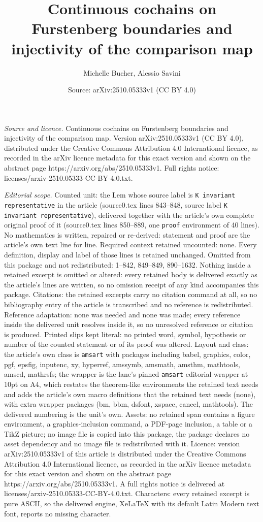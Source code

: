 \documentclass[10pt,a4paper]{amsart}
\title[Continuous cochains on Furstenberg boundaries and injectivit]{Continuous cochains on Furstenberg boundaries and injectivity of the comparison map}
\author{Michelle Bucher, Alessio Savini}
\date{Source: arXiv:2510.05333v1 (CC BY 4.0)}
\begin{document}
\maketitle

\noindent\emph{Source and licence.} Continuous cochains on Furstenberg boundaries and injectivity of the comparison map. Version arXiv:2510.05333v1 (CC BY 4.0), distributed under the Creative Commons Attribution 4.0 International licence, as recorded in the arXiv licence metadata for this exact version and shown on the abstract page https://arxiv.org/abs/2510.05333v1. Full rights notice: licenses/arxiv-2510.05333-CC-BY-4.0.txt.\par\smallskip

\noindent\textit{Editorial scope.} Counted unit: the Lem whose source label is \texttt{K invariant representative} in the article (source0.tex lines 843--848, source label \texttt{K invariant representative}), delivered together with the article's own complete original proof of it (source0.tex lines 850--889, one \texttt{proof} environment of 40 lines). No mathematics is written, repaired or re-derived: statement and proof are the article's own text line for line. Required context retained uncounted: none. Every definition, display and label of those lines is retained unchanged. Omitted from this package and not redistributed: 1--842, 849--849, 890--1632. Nothing inside a retained excerpt is omitted or altered: every retained body is delivered exactly as the article's lines are written, so no omission receipt of any kind accompanies this package. Citations: the retained excerpts carry no citation command at all, so no bibliography entry of the article is transcribed and no reference is redistributed. Reference adaptation: none was needed and none was made; every reference inside the delivered unit resolves inside it, so no unresolved reference or citation is produced. Printed slips kept literal: no printed word, symbol, hypothesis or number of the counted statement or of its proof was altered. Layout and class: the article's own class is \texttt{amsart} with packages including babel, graphics, color, pgf, epsfig, inputenc, xy, hyperref, amssymb, amsmath, amsthm, mathtools, amscd, mathrsfs; the wrapper is the lane's pinned \texttt{amsart} editorial wrapper at 10pt on A4, which restates the theorem-like environments the retained text needs and adds the article's own macro definitions that the retained text needs (none), with extra wrapper packages (bm, bbm, dsfont, xspace, cancel, mathtools). The delivered numbering is the unit's own. Assets: no retained span contains a figure environment, a graphics-inclusion command, a PDF-page inclusion, a table or a TikZ picture; no image file is copied into this package, the package declares no asset dependency and no image file is redistributed with it. Licence: version arXiv:2510.05333v1 of this article is distributed under the Creative Commons Attribution 4.0 International licence, as recorded in the arXiv licence metadata for this exact version and shown on the abstract page https://arxiv.org/abs/2510.05333v1. A full rights notice is delivered at licenses/arxiv-2510.05333-CC-BY-4.0.txt. Characters: every retained excerpt is pure ASCII, so the delivered engine, XeLaTeX with its default Latin Modern text font, reports no missing character.
\end{document}
